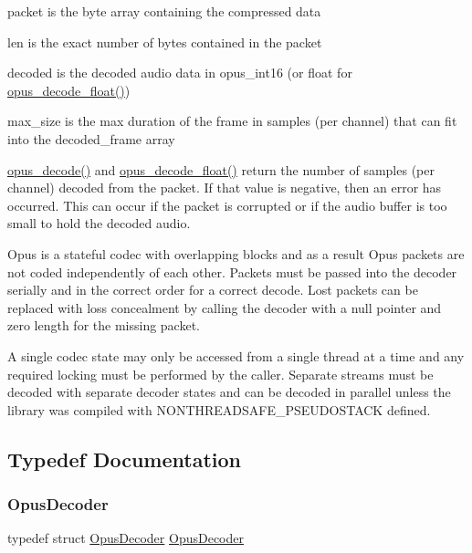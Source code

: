 \begin{DoxyItemize}
\item packet is the byte array containing the compressed data \item len is the exact number of bytes contained in the packet \item decoded is the decoded audio data in opus\+\_\+int16 (or float for \hyperlink{group__opus__decoder_gafe994758c0d6fa49cd38d63331d47bd4}{opus\+\_\+decode\+\_\+float()}) \item max\+\_\+size is the max duration of the frame in samples (per channel) that can fit into the decoded\+\_\+frame array\end{DoxyItemize}
\hyperlink{group__opus__decoder_ga3df1ea406cd9d23a63aed181903d3e5e}{opus\+\_\+decode()} and \hyperlink{group__opus__decoder_gafe994758c0d6fa49cd38d63331d47bd4}{opus\+\_\+decode\+\_\+float()} return the number of samples (per channel) decoded from the packet. If that value is negative, then an error has occurred. This can occur if the packet is corrupted or if the audio buffer is too small to hold the decoded audio.

Opus is a stateful codec with overlapping blocks and as a result Opus packets are not coded independently of each other. Packets must be passed into the decoder serially and in the correct order for a correct decode. Lost packets can be replaced with loss concealment by calling the decoder with a null pointer and zero length for the missing packet.

A single codec state may only be accessed from a single thread at a time and any required locking must be performed by the caller. Separate streams must be decoded with separate decoder states and can be decoded in parallel unless the library was compiled with N\+O\+N\+T\+H\+R\+E\+A\+D\+S\+A\+F\+E\+\_\+\+P\+S\+E\+U\+D\+O\+S\+T\+A\+CK defined. 

\subsection{Typedef Documentation}
\mbox{\label{group__opus__decoder_ga401d8579958d36094715a6b90cd159a6}} 
\subsubsection{\texorpdfstring{Opus\+Decoder}{OpusDecoder}}
{\footnotesize\ttfamily typedef struct \hyperlink{group__opus__decoder_ga401d8579958d36094715a6b90cd159a6}{Opus\+Decoder} \hyperlink{group__opus__decoder_ga401d8579958d36094715a6b90cd159a6}{Opus\+Decoder}}

